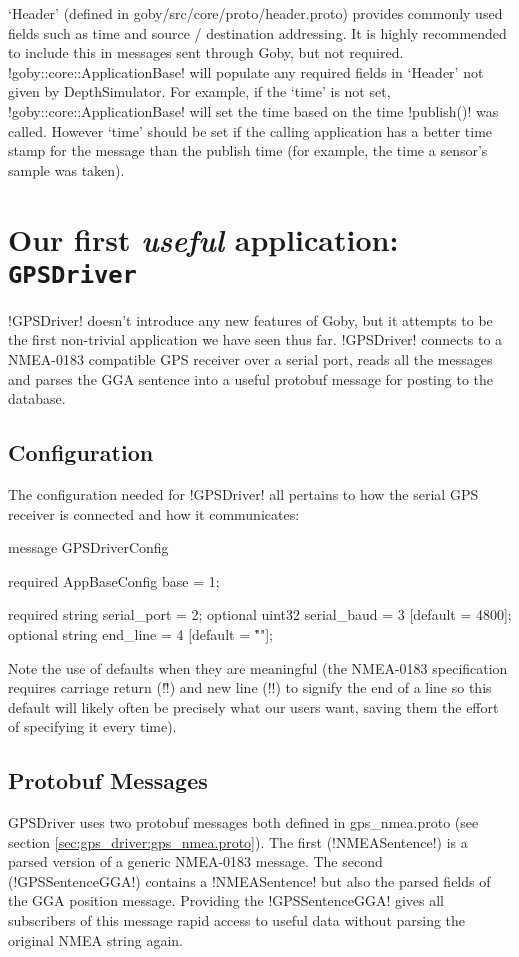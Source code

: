 `Header' (defined in goby/src/core/proto/header.proto) provides commonly used fields such as time and source / destination addressing. It is highly recommended to include this in messages sent through Goby, but not required. !goby::core::ApplicationBase! will populate any required fields in `Header' not given by DepthSimulator. For example, if the `time' is not set, !goby::core::ApplicationBase! will set the time based on the time !publish()! was called. However `time' should be set if the calling application has a better time stamp for the message than the publish time (for example, the time a sensor's sample was taken).

\section{Our first \textit{useful} application: \texttt{GPSDriver}}

!GPSDriver! doesn't introduce any new features of Goby, but it attempts to be the first non-trivial application we have seen thus far. !GPSDriver! connects to a NMEA-0183 compatible GPS receiver over a serial port, reads all the messages and parses the GGA sentence into a useful protobuf message for posting to the database.

\subsection{Configuration}
The configuration needed for !GPSDriver! all pertains to how the serial GPS receiver is connected and how it communicates:
\begin{boxedverbatim}
message GPSDriverConfig
{
  required AppBaseConfig base = 1;

  required string serial_port = 2;
  optional uint32 serial_baud = 3 [default = 4800];
  optional string end_line = 4 [default = "\r\n"];
}
\end{boxedverbatim}
\resetbvlinenumber

Note the use of defaults when they are meaningful (the NMEA-0183 specification requires carriage return (!\r!) and new line (!\n!) to signify the end of a line so this default will likely often be precisely what our users want, saving them the effort of specifying it every time).

\subsection{Protobuf Messages}
GPSDriver uses two \gls{protobuf} messages both defined in gps\_nmea.proto (see section \ref{sec:gps_driver:gps_nmea.proto}). The first (!NMEASentence!) is a parsed version of a generic NMEA-0183 message. The second (!GPSSentenceGGA!) contains a !NMEASentence! but also the parsed fields of the GGA position message. Providing the !GPSSentenceGGA! gives all subscribers of this message rapid access to useful data without parsing the original NMEA string again.

